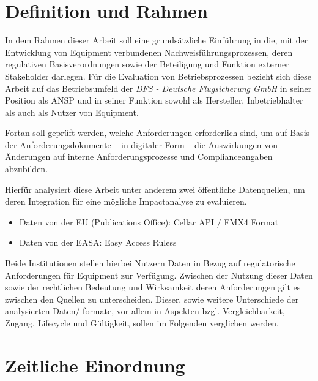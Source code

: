     \pagebreak
    \section{Definition und Rahmen}

        In dem Rahmen dieser Arbeit soll eine grundsätzliche Einführung in die, mit der Entwicklung von \atmans{} Equipment verbundenen Nachweisführungsprozessen, deren regulativen Basisverordnungen sowie der Beteiligung und Funktion externer Stakeholder darlegen.
        Für die Evaluation von Betriebsprozessen bezieht sich diese Arbeit auf das Betriebsumfeld der \textit{DFS - Deutsche Flugsicherung GmbH} in seiner Position als \ac{ANSP} und in seiner Funktion sowohl als Hersteller, Inbetriebhalter als auch als Nutzer von \atmans{} Equipment.

        Fortan soll geprüft werden, welche Anforderungen erforderlich sind, um auf Basis der Anforderungsdokumente -- in digitaler Form -- die Auswirkungen von Änderungen auf interne Anforderungsprozesse und Complianceangaben abzubilden.


        Hierfür analysiert diese Arbeit unter anderem zwei öffentliche Datenquellen, um deren Integration für eine mögliche Impactanalyse zu evaluieren.
        \begin{itemize}
            \item Daten von der EU (Publications Office): Cellar API / FMX4 Format
            \item Daten von der EASA: Easy Access Ruless
        \end{itemize}

        Beide Institutionen stellen hierbei Nutzern Daten in Bezug auf regulatorische Anforderungen für \atmans{} Equipment zur Verfügung.
        Zwischen der Nutzung dieser Daten sowie der rechtlichen Bedeutung und Wirksamkeit deren Anforderungen gilt es zwischen den Quellen zu unterscheiden.
        Dieser, sowie weitere Unterschiede der analysierten Daten/-formate, vor allem in Aspekten bzgl. Vergleichbarkeit, Zugang, Lifecycle und Gültigkeit, sollen im Folgenden verglichen werden.

    
\section{Zeitliche Einordnung}



